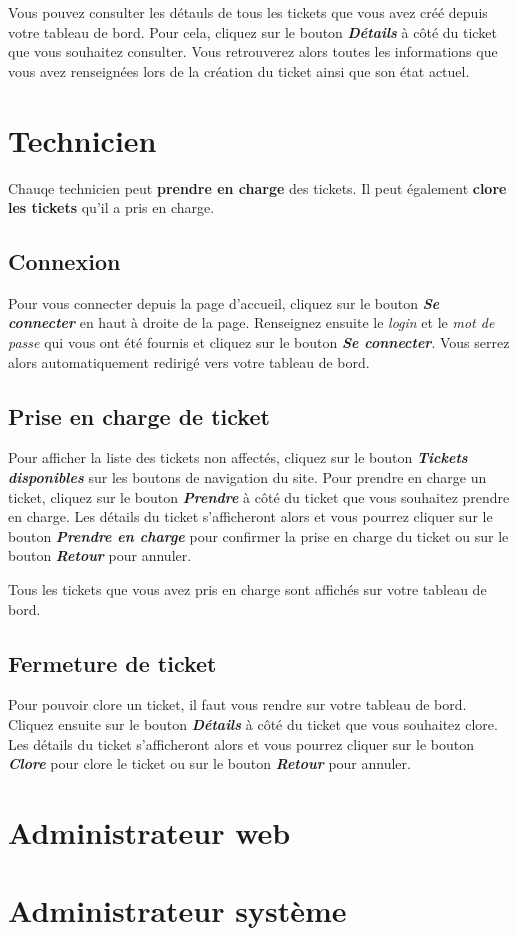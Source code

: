 \documentclass[12pt, a4paper]{article}
\begin{document}
Vous pouvez consulter les détauls de tous les tickets que vous avez créé depuis votre tableau de bord.
Pour cela, cliquez sur le bouton \textit{\textbf{Détails}} à côté du ticket que vous souhaitez consulter.
Vous retrouverez alors toutes les informations que vous avez renseignées lors de la création du ticket ainsi que son état actuel.

\section{Technicien}

Chauqe technicien peut \textbf{prendre en charge} des tickets. Il peut également \textbf{clore les tickets} qu'il a pris en charge.

\subsection*{Connexion}

Pour vous connecter depuis la page d'accueil, cliquez sur le bouton \textit{\textbf{Se connecter}} en haut à droite de la page.
Renseignez ensuite le \textit{login} et le \textit{mot de passe} qui vous ont été fournis et cliquez sur le bouton \textit{\textbf{Se connecter}}.
Vous serrez alors automatiquement redirigé vers votre tableau de bord.

\subsection*{Prise en charge de ticket}

Pour afficher la liste des tickets non affectés, cliquez sur le bouton \textit{\textbf{Tickets disponibles}} sur les boutons de navigation du site.
Pour prendre en charge un ticket, cliquez sur le bouton \textit{\textbf{Prendre}} à côté du ticket que vous souhaitez prendre en charge.
Les détails du ticket s'afficheront alors et vous pourrez cliquer sur le bouton \textit{\textbf{Prendre en charge}} pour confirmer la prise en charge du ticket ou sur le bouton \textit{\textbf{Retour}} pour annuler.

\bigskip
\noindent Tous les tickets que vous avez pris en charge sont affichés sur votre tableau de bord.

\subsection*{Fermeture de ticket}

Pour pouvoir clore un ticket, il faut vous rendre sur votre tableau de bord.
Cliquez ensuite sur le bouton \textit{\textbf{Détails}} à côté du ticket que vous souhaitez clore.
Les détails du ticket s'afficheront alors et vous pourrez cliquer sur le bouton \textit{\textbf{Clore}} pour clore le ticket ou sur le bouton \textit{\textbf{Retour}} pour annuler.

\section{Administrateur web}

\section{Administrateur système}
\end{document}
